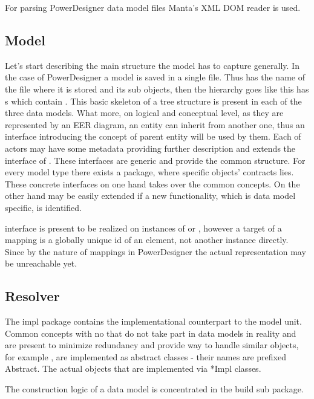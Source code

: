 For parsing PowerDesigner data model files Manta's XML DOM reader is used.

\subsection{Model}

Let's start describing the main structure the model has to capture generally.
In the case of PowerDesigner a model is saved in a single file. 
Thus  has the name of the file where it is stored and its sub objects, then the hierarchy goes like this  has s which contain .
This basic skeleton of a tree structure is present in each of the three data models. What more, on logical and conceptual level, as they are represented by an EER diagram, an entity can inherit from another one, thus an interface  introducing the concept of parent entity will be used by them. Each of actors may have some metadata providing further description and extends the interface of .
These interfaces are generic and provide the common structure.
For every model type there exists a package, where specific objects' contracts lies. These concrete interfaces on one hand takes over the common concepts. On the other hand may be easily extended if a new functionality, which is data model specific, is identified.

 interface is present to be realized on instances of  or  , however a target of a mapping is a globally unique id of an element, not another instance directly. Since by the nature of mappings in PowerDesigner the actual representation may be unreachable yet.

\subsection{Resolver}

The impl package contains the implementational counterpart to the model unit.
Common concepts with no that do not take part in data models in reality and are present to minimize redundancy and provide way to handle similar objects, for example , are implemented as abstract classes - their names are prefixed Abstract. The actual objects that are implemented via *Impl classes.

The construction logic of a data model is concentrated in the build sub package.

